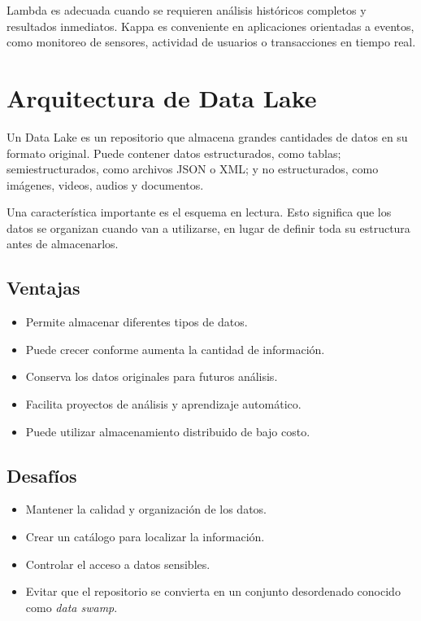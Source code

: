 Lambda es adecuada cuando se requieren análisis históricos completos y
resultados inmediatos. Kappa es conveniente en aplicaciones orientadas a
eventos, como monitoreo de sensores, actividad de usuarios o transacciones
en tiempo real.

\section{Arquitectura de Data Lake}

Un Data Lake es un repositorio que almacena grandes cantidades de datos en su
formato original. Puede contener datos estructurados, como tablas;
semiestructurados, como archivos JSON o XML; y no estructurados, como
imágenes, videos, audios y documentos.

Una característica importante es el esquema en lectura. Esto significa que
los datos se organizan cuando van a utilizarse, en lugar de definir toda su
estructura antes de almacenarlos.

\subsection{Ventajas}

\begin{itemize}
    \item Permite almacenar diferentes tipos de datos.
    \item Puede crecer conforme aumenta la cantidad de información.
    \item Conserva los datos originales para futuros análisis.
    \item Facilita proyectos de análisis y aprendizaje automático.
    \item Puede utilizar almacenamiento distribuido de bajo costo.
\end{itemize}

\subsection{Desafíos}

\begin{itemize}
    \item Mantener la calidad y organización de los datos.
    \item Crear un catálogo para localizar la información.
    \item Controlar el acceso a datos sensibles.
    \item Evitar que el repositorio se convierta en un conjunto desordenado
    conocido como \textit{data swamp}.
\end{itemize}

